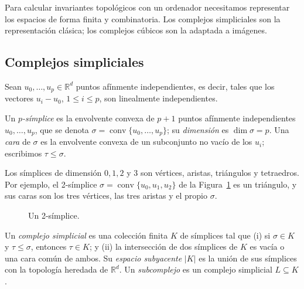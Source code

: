 Para calcular invariantes topológicos con un ordenador necesitamos
representar los espacios de forma finita y combinatoria. Los complejos
simpliciales son la representación clásica; los complejos cúbicos son la
adaptada a imágenes.

\subsection{Complejos simpliciales}

Sean $u_0,\dots,u_p\in\mathbb{R}^d$ puntos afínmente independientes, es
decir, tales que los vectores $u_i-u_0$, $1\le i\le p$, son linealmente
independientes.

\begin{definicion}
Un \emph{$p$-símplice} es la envolvente convexa de $p+1$ puntos
afínmente independientes $u_0,\dots,u_p$, que se denota
$\sigma=\operatorname{conv}\{u_0,\dots,u_p\}$; su \emph{dimensión} es $\dim\sigma=p$. Una \emph{cara} de
$\sigma$ es la envolvente convexa de un subconjunto no vacío de los $u_i$;
escribimos $\tau\le\sigma$.
\end{definicion}

Los símplices de dimensión $0,1,2$ y $3$ son vértices, aristas, triángulos
y tetraedros. Por ejemplo, el 2-símplice
$\sigma=\operatorname{conv}\{u_0,u_1,u_2\}$ de la
Figura~\ref{fig:simplice} es un triángulo, y sus caras son los tres
vértices, las tres aristas y el propio $\sigma$.

\begin{figure}[ht]
\centering
{}
\caption{Un 2-símplice.}
\label{fig:simplice}
\end{figure}

\begin{definicion}
Un \emph{complejo simplicial} es una colección finita $K$ de símplices tal
que (i) si $\sigma\in K$ y $\tau\le\sigma$, entonces $\tau\in K$; y (ii) la
intersección de dos símplices de $K$ es vacía o una cara común de ambos.
Su \emph{espacio subyacente} $|K|$ es la unión de sus símplices con la
topología heredada de $\mathbb{R}^d$. Un \emph{subcomplejo} es un
complejo simplicial $L\subseteq K$.
\end{definicion}

